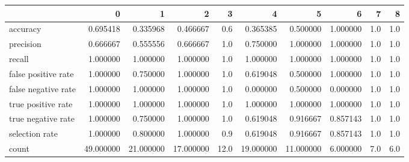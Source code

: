 \begin{tabular}{lrrrrrrrrr}
\toprule
{} &          0 &          1 &          2 &     3 &          4 &          5 &         6 &    7 &    8 \\
\midrule
accuracy            &   0.695418 &   0.335968 &   0.466667 &   0.6 &   0.365385 &   0.500000 &  1.000000 &  1.0 &  1.0 \\
precision           &   0.666667 &   0.555556 &   0.666667 &   1.0 &   0.750000 &   1.000000 &  1.000000 &  1.0 &  1.0 \\
recall              &   1.000000 &   1.000000 &   1.000000 &   1.0 &   1.000000 &   1.000000 &  1.000000 &  1.0 &  1.0 \\
false positive rate &   1.000000 &   0.750000 &   1.000000 &   1.0 &   0.619048 &   0.500000 &  1.000000 &  1.0 &  1.0 \\
false negative rate &   1.000000 &   1.000000 &   1.000000 &   1.0 &   0.000000 &   0.500000 &  0.000000 &  1.0 &  1.0 \\
true positive rate  &   1.000000 &   1.000000 &   1.000000 &   1.0 &   1.000000 &   1.000000 &  1.000000 &  1.0 &  1.0 \\
true negative rate  &   1.000000 &   0.750000 &   1.000000 &   1.0 &   0.619048 &   0.916667 &  0.857143 &  1.0 &  1.0 \\
selection rate      &   1.000000 &   0.800000 &   1.000000 &   0.9 &   0.619048 &   0.916667 &  0.857143 &  1.0 &  1.0 \\
count               &  49.000000 &  21.000000 &  17.000000 &  12.0 &  19.000000 &  11.000000 &  6.000000 &  7.0 &  6.0 \\
\bottomrule
\end{tabular}
